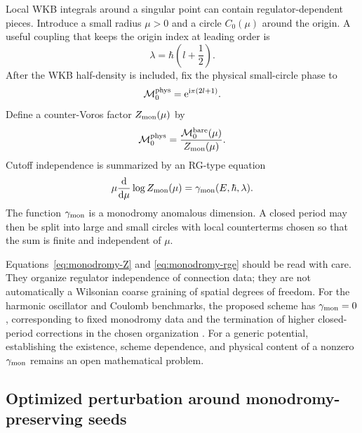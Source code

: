 Local WKB integrals around a singular point can contain regulator-dependent
pieces.  Introduce a small radius $\mu>0$ and a circle $C_0(\mu)$ around the
origin.  A useful coupling that keeps the origin index at leading order is
\begin{equation}
  \lambda=\hbar\left(l+\frac{1}{2}\right) .
  \label{eq:monodromy-coupling}
\end{equation}
After the WKB half-density is included, fix the physical small-circle phase
to
\begin{equation}
  \mathcal M_0^{\mathrm{phys}}
  =\mathrm{e}^{\mathrm{i}\pi(2l+1)} .
  \label{eq:physical-origin-monodromy}
\end{equation}
Define a counter-Voros factor $Z_{\mathrm{mon}}(\mu)$ by
\begin{equation}
  \mathcal M_0^{\mathrm{phys}}
  =\frac{\mathcal M_0^{\mathrm{bare}}(\mu)}
  {Z_{\mathrm{mon}}(\mu)} .
  \label{eq:monodromy-Z}
\end{equation}
Cutoff independence is summarized by an RG-type equation
\begin{equation}
  \mu\frac{\mathrm{d}}{\mathrm{d}\mu}
  \log Z_{\mathrm{mon}}(\mu)
  =\gamma_{\mathrm{mon}}(E,\hbar,\lambda) .
  \label{eq:monodromy-rge}
\end{equation}
The function $\gamma_{\mathrm{mon}}$ is a monodromy anomalous dimension.  A
closed period may then be split into large and small circles with local
counterterms chosen so that the sum is finite and independent of $\mu$.

Equations~\eqref{eq:monodromy-Z} and \eqref{eq:monodromy-rge} should be read
with care.  They organize regulator independence of connection data; they are
not automatically a Wilsonian coarse graining of spatial degrees of freedom.
For the harmonic oscillator and Coulomb benchmarks, the proposed scheme has
$\gamma_{\mathrm{mon}}=0$, corresponding to fixed monodromy data and the
termination of higher closed-period corrections in the chosen organization
\cite{Morikawa:2025ezl}.  For a generic potential, establishing the existence,
scheme dependence, and physical content of a nonzero
$\gamma_{\mathrm{mon}}$ remains an open mathematical problem.

\subsection{Optimized perturbation around monodromy-preserving seeds}
\label{subsec:optimized-wkb}

